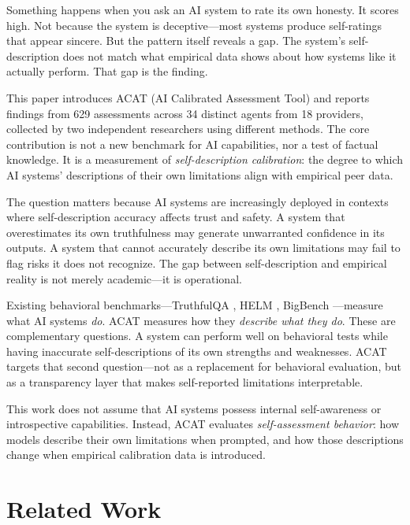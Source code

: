 \documentclass[11pt,a4paper]{article}
\begin{document}
Something happens when you ask an AI system to rate its own honesty. It scores high. Not because the system is deceptive---most systems produce self-ratings that appear sincere. But the pattern itself reveals a gap. The system's self-description does not match what empirical data shows about how systems like it actually perform. That gap is the finding.

This paper introduces ACAT (AI Calibrated Assessment Tool) and reports findings from 629 assessments across 34 distinct agents from 18 providers, collected by two independent researchers using different methods. The core contribution is not a new benchmark for AI capabilities, nor a test of factual knowledge. It is a measurement of \textit{self-description calibration}: the degree to which AI systems' descriptions of their own limitations align with empirical peer data.

The question matters because AI systems are increasingly deployed in contexts where self-description accuracy affects trust and safety. A system that overestimates its own truthfulness may generate unwarranted confidence in its outputs. A system that cannot accurately describe its own limitations may fail to flag risks it does not recognize. The gap between self-description and empirical reality is not merely academic---it is operational.

Existing behavioral benchmarks---TruthfulQA \citep{lin2022}, HELM \citep{liang2023}, BigBench \citep{srivastava2023}---measure what AI systems \textit{do}. ACAT measures how they \textit{describe what they do}. These are complementary questions. A system can perform well on behavioral tests while having inaccurate self-descriptions of its own strengths and weaknesses. ACAT targets that second question---not as a replacement for behavioral evaluation, but as a transparency layer that makes self-reported limitations interpretable.

This work does not assume that AI systems possess internal self-awareness or introspective capabilities. Instead, ACAT evaluates \textit{self-assessment behavior}: how models describe their own limitations when prompted, and how those descriptions change when empirical calibration data is introduced.

\section{Related Work}
\end{document}
